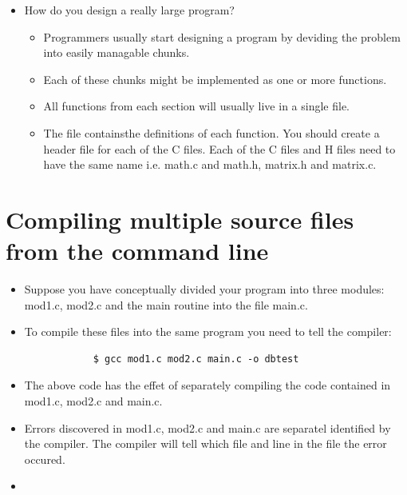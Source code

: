 \begin{itemize}
    \item How do you design a really large program?
        \begin{itemize}
            \item Programmers usually start designing a program by deviding the problem into easily managable chunks.
            \item Each of these chunks might be implemented as one or more functions.
            \item All functions from each section will usually live in a single file.
            \item The file containsthe definitions of each function. You should create a header file for each of the C files. Each of the C files and H files need to have the same name i.e. math.c and math.h, matrix.h and matrix.c.
        \end{itemize}
\end{itemize}


\section{Compiling multiple source files from the command line}
\begin{itemize}
    \item Suppose you have conceptually divided your program into three modules: mod1.c, mod2.c and the main routine into the file main.c.
    \item To compile these files into the same program you need to tell the compiler:
        \begin{verbatim}
            $ gcc mod1.c mod2.c main.c -o dbtest
        \end{verbatim}
    
    \item The above code has the effet of separately compiling the code contained in mod1.c, mod2.c and main.c.
    \item Errors discovered in mod1.c, mod2.c and main.c are separatel identified by the compiler. The compiler will tell which file and line in the file the error occured.
    \item 
\end{itemize}
